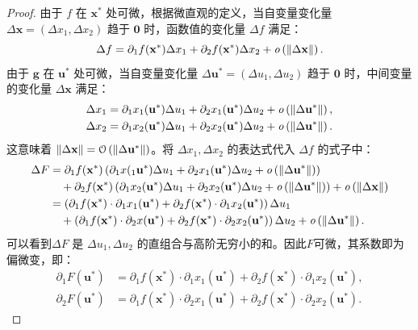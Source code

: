 \documentclass[12pt,UTF8]{ctexbook}
\begin{document}
\begin{proof}
由于 $f$ 在 $\mathbf{x}^*$ 处可微，根据微直观的定义，当自变量变化量 $\Delta \mathbf{x} = (\Delta x_1, \Delta x_2)$ 趋于 $\mathbf{0}$ 时，函数值的变化量 $\Delta f$ 满足：
$$ \Delta f = \partial_1 f(\mathbf{x}^*) \Delta x_1 + \partial_2 f(\mathbf{x}^*) \Delta x_2 + \mathit{o}\left(\|\Delta \mathbf{x}\|\right). $$
由于 $\mathbf{g}$ 在 $\mathbf{u}^*$ 处可微，当自变量变化量 $\Delta \mathbf{u}^* = (\Delta u_1, \Delta u_2)$ 趋于 $\mathbf{0}$ 时，中间变量的变化量 $\Delta \mathbf{x}$ 满足：
\begin{align*}
\Delta x_1 &= \partial_1 x_1(\mathbf{u}^*) \Delta u_1 + \partial_2 x_1(\mathbf{u}^*) \Delta u_2 + \mathit{o}\left(\|\Delta \mathbf{u}^*\|\right), \\
\Delta x_2 &= \partial_1 x_2(\mathbf{u}^*) \Delta u_1 + \partial_2 x_2(\mathbf{u}^*) \Delta u_2 + \mathit{o}\left(\|\Delta \mathbf{u}^*\|\right).
\end{align*}
这意味着 $\|\Delta \mathbf{x}\| = \mathcal{O}\left(\|\Delta \mathbf{u}^*\|\right)$。将 $\Delta x_1, \Delta x_2$ 的表达式代入 $\Delta f$ 的式子中：
\begin{align*}
\Delta F &= \partial_1 f(\mathbf{x}^*) \left( \partial_1 x(_1\mathbf{u}^*) \Delta u_1 + \partial_2 x_1(\mathbf{u}^*) \Delta u_2 + \mathit{o}\left(\|\Delta \mathbf{u}^*\|\right) \right) \\
&\quad + \partial_2 f(\mathbf{x}^*) \left( \partial_1 x_2(\mathbf{u}^*) \Delta u_1 + \partial_2 x_2(\mathbf{u}^*) \Delta u_2 + \mathit{o}\left(\|\Delta \mathbf{u}^*\|\right) \right) + \mathit{o}\left(\|\Delta \mathbf{x}\|\right) \\
&= \left( \partial_1 f(\mathbf{x}^*) \cdot \partial_1 x_1(\mathbf{u}^*) + \partial_2 f(\mathbf{x}^*) \cdot \partial_1 x_2(\mathbf{u}^*) \right) \Delta u_1 \\
&\quad + \left( \partial_1 f(\mathbf{x}^*) \cdot \partial_2 x(\mathbf{u}^*) + \partial_2 f(\mathbf{x}^*) \cdot \partial_2 x_2(\mathbf{u}^*) \right) \Delta u_2 + \mathit{o}\left(\|\Delta \mathbf{u}^*\|\right).
\end{align*}
可以看到$\Delta F$ 是 $\Delta u_1, \Delta u_2$ 的直组合与高阶无穷小的和。因此$F$可微，其系数即为偏微变，即：
\begin{align*}
    \partial_1 F(\mathbf{u}^*) &= \partial_1 f(\mathbf{x}^*) \cdot \partial_1 x_1(\mathbf{u}^*) + \partial_2 f(\mathbf{x}^*) \cdot \partial_1 x_2(\mathbf{u}^*), \\
    \partial_2 F(\mathbf{u}^*) &= \partial_1 f(\mathbf{x}^*) \cdot \partial_2 x_1(\mathbf{u}^*) + \partial_2 f(\mathbf{x}^*) \cdot \partial_2 x_2(\mathbf{u}^*).
\end{align*}
\end{proof}
\end{document}
